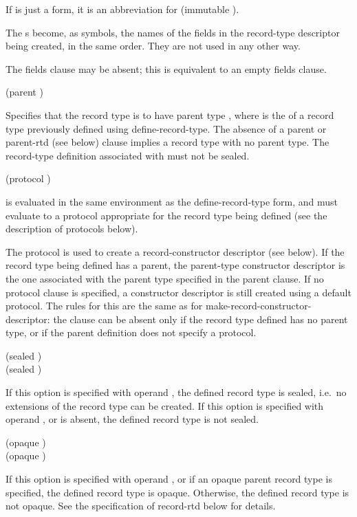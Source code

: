 \begin{entry}
If  is just a  form, it is an
abbreviation for {\cf (immutable )}.

The s become, as symbols, the names of the fields in
the record-type descriptor being created, in the same order. They are
not used in any other way.

The {\cf fields} clause may be absent; this is equivalent to an empty
{\cf fields} clause.

{\cf (parent )}
   
Specifies that the record type is to have parent type , where  is the  of a
record type previously defined using {\cf define-record-type}. The
absence of a {\cf parent} or {\cf parent-rtd} (see below) clause
implies a record type with no parent type.  The record-type definition
associated with  must not be sealed.

{\cf (protocol )}
   
 is evaluated in the same environment as the
define-record-type form, and must evaluate to a protocol appropriate
for the record type being defined (see the description of protocols
below).

The protocol is used to create a record-constructor descriptor (see
below).  If the record type being defined has a parent, the
parent-type constructor descriptor is the one associated with the
parent type specified in the {\cf parent} clause.  If no {\cf
  protocol} clause is specified, a constructor descriptor is still
created using a default protocol. The rules for this are the same as
for {\cf make-record-constructor-descriptor}: the clause can be absent
only if the record type defined has no parent type, or if the parent
definition does not specify a protocol.

{\cf (sealed \schtrue)}\\
{\cf (sealed \schfalse)}
   
If this option is specified with operand \schtrue, the defined record
type is sealed, i.e.\ no extensions of the record type can be created.
If this option is specified with operand \schfalse, or is absent, the
defined record type is not sealed.

{\cf (opaque \schtrue)}\\
{\cf (opaque \schfalse)}
   
If this option is specified with operand \schtrue, or if an opaque
parent record type is specified, the defined record type is opaque.
Otherwise, the defined record type is not opaque.  See the
specification of {\cf record-rtd} below for details.
   

\end{entry}
